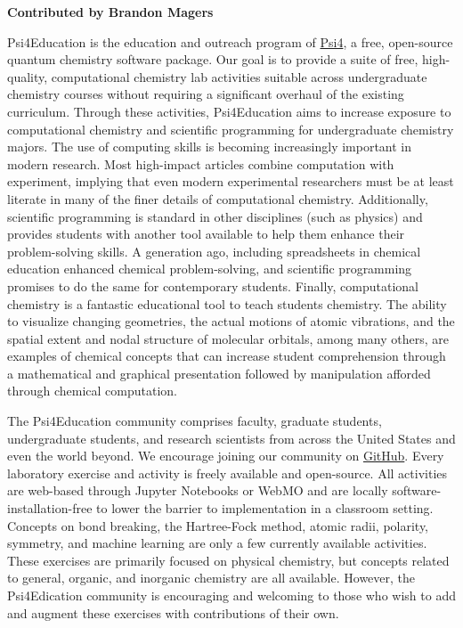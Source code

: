 \textbf{Contributed by Brandon Magers}

Psi4Education is the education and outreach program of \href{psicode.org}{Psi4}, 
a free, open-source quantum chemistry software package.  Our goal is to provide a suite of free, high-quality, computational chemistry lab activities suitable across undergraduate chemistry courses without requiring a significant overhaul of the existing curriculum. 
Through these activities, Psi4Education aims to increase exposure to computational chemistry and scientific programming for undergraduate chemistry majors.  
The use of computing skills is becoming increasingly important in modern research. 
Most high-impact articles combine computation with experiment, implying that even modern experimental researchers must be at least literate in many of the finer details of computational chemistry. 
Additionally, scientific programming is standard in other disciplines (such as physics) and provides students with another tool available to help them enhance their problem-solving skills. 
A generation ago, including spreadsheets in chemical education enhanced chemical problem-solving, and scientific programming promises to do the same for contemporary students. 
Finally, computational chemistry is a fantastic educational tool to teach students chemistry. 
The ability to visualize changing geometries, the actual motions of atomic vibrations, and the spatial extent and nodal structure of molecular orbitals, among many others, are examples of chemical concepts that can increase student comprehension through a mathematical and graphical presentation followed by manipulation afforded through chemical computation.

The Psi4Education community comprises faculty, graduate students, undergraduate students, and research scientists from across the United States and even the world beyond.  
We encourage joining our community on \href{https://github.com/Psi4Education}{GitHub}.  
Every laboratory exercise and activity is freely available and open-source.  
All activities are web-based through Jupyter Notebooks or WebMO and are locally software-installation-free to lower the barrier to implementation in a classroom setting.  
Concepts on bond breaking, the Hartree-Fock method, atomic radii, polarity, symmetry, and machine learning are only a few currently available activities.  
These exercises are primarily focused on physical chemistry, but concepts related to general, organic, and inorganic chemistry are all available. 
However, the Psi4Edication community is encouraging and welcoming to those who wish to add and augment these exercises with contributions of their own.
